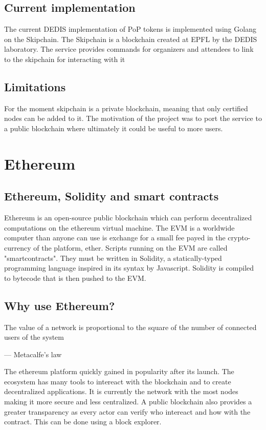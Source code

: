 \documentclass[11pt, a4paper, twoside, openright]{book} %
\begin{document}
\subsection{Current implementation}
The current DEDIS implementation of PoP tokens is implemented using Golang on the Skipchain. The Skipchain is a blockchain created at EPFL by the DEDIS laboratory. The service provides commands for organizers and attendees to link to the skipchain for interacting with it 

\subsection{Limitations}
For the moment skipchain is a private blockchain, meaning that only certified nodes can be added to it. The motivation of the project was to port the service to a public blockchain where ultimately it could be useful to more users. 

\section{Ethereum}

\subsection{Ethereum, Solidity and smart contracts}
 Ethereum is an open-source public blockchain which can perform decentralized computations on the ethereum virtual machine. The EVM is a worldwide computer than anyone can use is exchange for a small fee payed in the crypto-currency of the platform, ether. Scripts running on the EVM are called "smartcontracts". They must be written in Solidity, a statically-typed programming language inspired in its syntax by Javascript. Solidity is compiled to bytecode that is then pushed to the EVM. 


\subsection{Why use Ethereum?}

\epigraph{The value of a network is proportional to the square of the number of connected users of the system}
{--- \textup{Metacalfe's law}}

The ethereum platform quickly gained in popularity after its launch. The ecosystem has many tools to intereact with the blockchain and to create decentralized applications. It is currently the network with the most nodes making it more secure and less centralized. A public blockchain also provides a greater transparency as every actor can verify who intereact and how with the contract. This can be done using a block explorer. 
\end{document}
